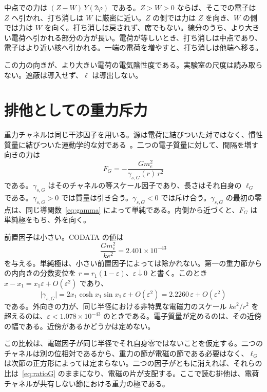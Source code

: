 \documentclass[a4paper]{article}
\begin{document}
中点での力は \((Z-W)\,Y(2\varphi)\) である。\(Z>W>0\) ならば、そこでの電子は \(Z\) へ引かれ、打ち消しは \(W\) に厳密に近い。\(Z\) の側では力は \(Z\) を向き、\(W\) の側では力は \(W\) を向く。打ち消しは戻されず、席でもない。線分のうち、より大きい電荷へ引かれる部分の方が長い。電荷が等しいとき、打ち消しは中点であり、電子はより近い核へ引かれる。一端の電荷を増やすと、打ち消しは他端へ移る。

この力の向きが、より大きい電荷の電気陰性度である。実験室の尺度は読み取らない。遮蔽は導入せず、\(\ell\) は導出しない。

\section{排他としての重力斥力}
\label{sec:pauli}

重力チャネルは同じ干渉因子を用いる。源は電荷に結びついた対ではなく、慣性質量に結びついた運動学的な対である~\cite{dst-main}。二つの電子質量に対して、間隔を増す向きの力は
\begin{equation}
\label{eq:grav}
F_G=-\frac{G m_e^{2}}{\gamma_{s,G}(r)\,r^{2}}
\end{equation}
である。\(\gamma_{s,G}\) はそのチャネルの等スケール因子であり、長さはそれ自身の \(\ell_G\) である。\(\gamma_{s,G}>0\) では質量は引き合う。\(\gamma_{s,G}<0\) では斥け合う。\(\gamma_{s,G}\) の最初の零点は、同じ導関数~\eqref{eq:gamma} によって単純である。内側から近づくと、\(F_G\) は単純極をもち、外を向く。

前置因子は小さい。CODATA の値は
\begin{equation}
\label{eq:ratioG}
\frac{G m_e^{2}}{k e^{2}}=2.401\times 10^{-43}
\end{equation}
を与える。単純極は、小さい前置因子によっては除かれない。第一の重力節からの内向きの分数変位を \(r=r_1(1-\varepsilon)\)、\(\varepsilon\downarrow 0\) と書く。このとき \(x-x_1=x_1\varepsilon+O(\varepsilon^{2})\) であり、
\[
\bigl|\gamma_{s,G}\bigr|
  =2x_1\cosh x_1\sin x_1\,\varepsilon+O(\varepsilon^{2})
  =2.2260\,\varepsilon+O(\varepsilon^{2})
\]
である。外向きの力が、同じ半径における非特異な電磁力のスケール \(k e^{2}/r^{2}\) を超えるのは、\(\varepsilon<1.078\times 10^{-43}\) のときである。電子質量が定めるのは、その近傍の幅である。近傍があるかどうかは定めない。

この比較は、電磁因子が同じ半径でそれ自身零ではないことを仮定する。二つのチャネルは別の位相対であるから、重力の節が電磁の節である必要はなく、\(\ell_G\) は次節の正方形によっては定まらない。二つの因子がともに消えれば、それらの比は~\eqref{eq:ratioG} のままになり、電磁の片が支配する。ここで読む排他は、電荷チャネルが共有しない節における重力の極である。
\end{document}

